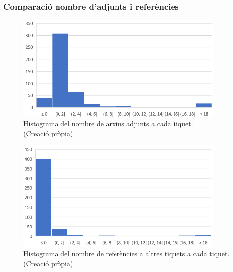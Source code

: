 \subsubsection{Comparació nombre d'adjunts i referències}
\begin{figure}[H]
    \centering
    \includegraphics[width=0.9\textwidth]{histograma_num_adj.png}
    \caption[Histograma del nombre d'adjunts a cada tiquet]{Histograma del nombre de arxius adjunts a cada tiquet. \\ (Creació pròpia)}
    \label{fig:histograma_num_adj}
\end{figure}


\begin{figure}[H]
    \centering
    \includegraphics[width=0.9\textwidth]{histograma_num_refs.png}
    \caption[Histograma del nombre de referències a cada tiquet]{Histograma del nombre de referències a altres tiquets a cada tiquet. \\ (Creació pròpia)}
    \label{fig:histograma_num_refs}
\end{figure}
